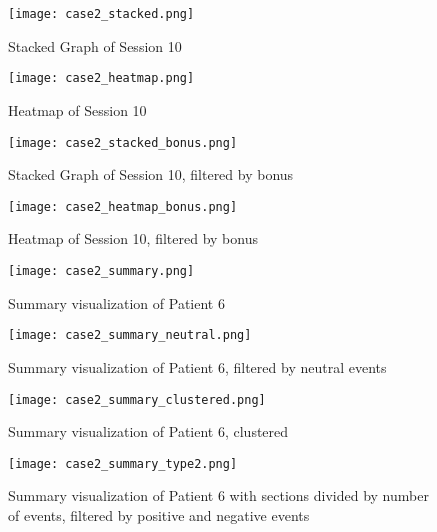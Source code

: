 \begin{figure}
\centering
\texttt{[image: case2\_stacked.png]}
\caption{Stacked Graph of Session 10}
\label{fig:case2_stacked}
\end{figure}

\begin{figure}
\centering
\texttt{[image: case2\_heatmap.png]}
\caption{Heatmap of Session 10}
\label{fig:case2_heatmap}
\end{figure}

\begin{figure}
\centering
\texttt{[image: case2\_stacked\_bonus.png]}
\caption{Stacked Graph of Session 10, filtered by bonus}
\label{fig:case2_stacked_bonus}
\end{figure}

\begin{figure}
\centering
\texttt{[image: case2\_heatmap\_bonus.png]}
\caption{Heatmap of Session 10, filtered by bonus}
\label{fig:case2_heatmap_bonus}
\end{figure}

\begin{figure}
\centering
\texttt{[image: case2\_summary.png]}
\caption{Summary visualization of Patient 6}
\label{fig:case2_summary}
\end{figure}

\begin{figure}
\centering
\texttt{[image: case2\_summary\_neutral.png]}
\caption{Summary visualization of Patient 6, filtered by neutral events}
\label{fig:case2_summary_neutral}
\end{figure}

\begin{figure}
\centering
\texttt{[image: case2\_summary\_clustered.png]}
\caption{Summary visualization of Patient 6, clustered}
\label{fig:case2_summary_clustered}
\end{figure}

\begin{figure}
\centering
\texttt{[image: case2\_summary\_type2.png]}
\caption{Summary visualization of Patient 6 with sections divided by number of events, filtered by positive and negative events}
\label{fig:case2_summary_type2}
\end{figure}